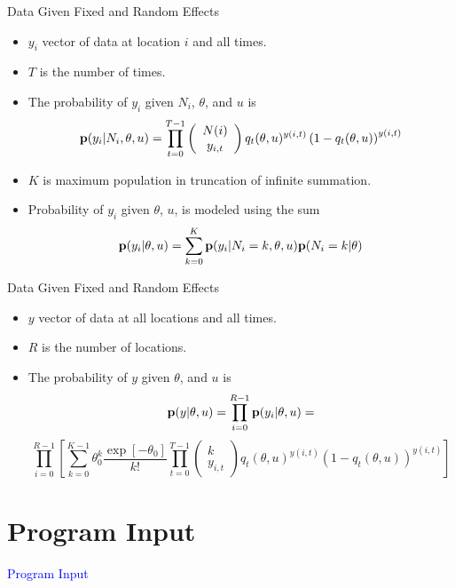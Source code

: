 \documentclass{beamer}
\newcommand{\Blue}[1]{\textcolor{blue}{#1}}
\newcommand{\B}[1]{{\bf #1}}
\newcommand{\Section}[1]{
    \section{#1}
    \begin{frame}
    \begin{center}
    \Blue{ \Large{#1} }
    \end{center}
    \end{frame}
}
\begin{document}
\begin{frame}{Data Given Fixed and Random Effects}
\begin{itemize}

\item
$y_i$ vector of data at location $i$ and all times.
\pause

\item
$T$ is the number of times.
\pause

\item
The probability of $y_i$ given $N_i$, $\theta$, and $u$ is
\[
\B{p}( y_i | N_i, \theta , u )
=
\prod_{t=0}^{T-1}
\left( \begin{array}{c} {N(i)} \\ y_{i,t} \end{array} \right)
    q_t ( \theta , u)^{y(i,t)}
    \left( 1 - q_t( \theta , u) \right)^{y(i,t)}
\]
\pause

\item
$K$ is maximum population in truncation of infinite summation.
\pause

\item
Probability of $y_i$ given $\theta$, $u$, is modeled using the sum
\[
\B{p}( y_i | \theta , u )
=
\sum_{k=0}^K \B{p}( y_i | N_i=k, \theta , u ) \B{p}( N_i=k | \theta )
\]
\pause

\end{itemize}
\end{frame}
%
\begin{frame}{Data Given Fixed and Random Effects}
\begin{itemize}

\item
$y$ vector of data at all locations and all times.
\pause
%
\item
$R$ is the number of locations.
\pause
%
\item
The probability of $y$ given $\theta$, and $u$ is
\[
\B{p}( y | \theta , u )
=
\prod_{i=0}^{R-1} \B{p}( y_i | \theta , u )
=
\]
\pause
\[
\prod_{i=0}^{R-1}
\left[
\sum_{k=0}^{K-1}
\theta_0^k \frac{ \exp[ - \theta_0 ] }{ k ! }
\prod_{t=0}^{T-1}
\left( \begin{array}{c} {k} \\ y_{i,t} \end{array} \right)
    q_t ( \theta , u)^{y(i,t)}
    \left( 1 - q_t( \theta , u) \right)^{y(i,t)}
\right]
\]

\end{itemize}
\end{frame}
\Section{Program Input}
\end{document}
